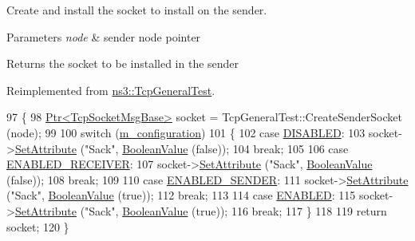 Create and install the socket to install on the sender. 


\begin{DoxyParams}{Parameters}
{\em node} & sender node pointer \\
\hline
\end{DoxyParams}
\begin{DoxyReturn}{Returns}
the socket to be installed in the sender 
\end{DoxyReturn}


Reimplemented from \hyperlink{classns3_1_1TcpGeneralTest_a0476c37d8a08b42d42f6ea2634eece70}{ns3\+::\+Tcp\+General\+Test}.


\begin{DoxyCode}
97 \{
98   \hyperlink{classns3_1_1Ptr}{Ptr<TcpSocketMsgBase>} socket = TcpGeneralTest::CreateSenderSocket (node);
99 
100   \textcolor{keywordflow}{switch} (\hyperlink{classSackPermittedTestCase_aff7ae43e44e4fb3f7286e9d3083f2732}{m\_configuration})
101     \{
102     \textcolor{keywordflow}{case} \hyperlink{classSackPermittedTestCase_a2dc95ae5e965bc36df7ea84c64723493ac7dca56a5fac1080b2ee4d83cfa2005e}{DISABLED}:
103       socket->\hyperlink{classns3_1_1ObjectBase_ac60245d3ea4123bbc9b1d391f1f6592f}{SetAttribute} (\textcolor{stringliteral}{"Sack"}, \hyperlink{classns3_1_1BooleanValue}{BooleanValue} (\textcolor{keyword}{false}));
104       \textcolor{keywordflow}{break};
105 
106     \textcolor{keywordflow}{case} \hyperlink{classSackPermittedTestCase_a2dc95ae5e965bc36df7ea84c64723493a3c0e8b65f47a69fca9d52f403274742c}{ENABLED\_RECEIVER}:
107       socket->\hyperlink{classns3_1_1ObjectBase_ac60245d3ea4123bbc9b1d391f1f6592f}{SetAttribute} (\textcolor{stringliteral}{"Sack"}, \hyperlink{classns3_1_1BooleanValue}{BooleanValue} (\textcolor{keyword}{false}));
108       \textcolor{keywordflow}{break};
109 
110     \textcolor{keywordflow}{case} \hyperlink{classSackPermittedTestCase_a2dc95ae5e965bc36df7ea84c64723493aef344cc4eec6eedc3e644b86edc4db95}{ENABLED\_SENDER}:
111       socket->\hyperlink{classns3_1_1ObjectBase_ac60245d3ea4123bbc9b1d391f1f6592f}{SetAttribute} (\textcolor{stringliteral}{"Sack"}, \hyperlink{classns3_1_1BooleanValue}{BooleanValue} (\textcolor{keyword}{true}));
112       \textcolor{keywordflow}{break};
113 
114     \textcolor{keywordflow}{case} \hyperlink{classSackPermittedTestCase_a2dc95ae5e965bc36df7ea84c64723493a895f2f11241beaf1334839f4056a0531}{ENABLED}:
115       socket->\hyperlink{classns3_1_1ObjectBase_ac60245d3ea4123bbc9b1d391f1f6592f}{SetAttribute} (\textcolor{stringliteral}{"Sack"}, \hyperlink{classns3_1_1BooleanValue}{BooleanValue} (\textcolor{keyword}{true}));
116       \textcolor{keywordflow}{break};
117     \}
118 
119   \textcolor{keywordflow}{return} socket;
120 \}
\end{DoxyCode}


